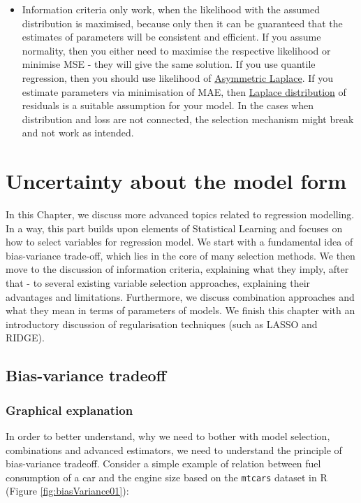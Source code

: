 \documentclass[
]{book}
\providecommand{\tightlist}{%
  \setlength{\itemsep}{0pt}\setlength{\parskip}{0pt}}
\theoremstyle{definition}
\theoremstyle{definition}
\theoremstyle{definition}
\theoremstyle{definition}
\theoremstyle{remark}
\begin{document}
\begin{itemize}
\tightlist
\item
  Information criteria only work, when the likelihood with the assumed distribution is maximised, because only then it can be guaranteed that the estimates of parameters will be consistent and efficient. If you assume normality, then you either need to maximise the respective likelihood or minimise MSE - they will give the same solution. If you use quantile regression, then you should use likelihood of \hyperref[distributionsALaplace]{Asymmetric Laplace}. If you estimate parameters via minimisation of MAE, then \hyperref[distributionsLaplace]{Laplace distribution} of residuals is a suitable assumption for your model. In the cases when distribution and loss are not connected, the selection mechanism might break and not work as intended.
\end{itemize}

\chapter{Uncertainty about the model form}\label{uncertaintyModel}

In this Chapter, we discuss more advanced topics related to regression modelling. In a way, this part builds upon elements of Statistical Learning \citep[see, for example, the textbook of][]{Hastie2009} and focuses on how to select variables for regression model. We start with a fundamental idea of bias-variance trade-off, which lies in the core of many selection methods. We then move to the discussion of information criteria, explaining what they imply, after that - to several existing variable selection approaches, explaining their advantages and limitations. Furthermore, we discuss combination approaches and what they mean in terms of parameters of models. We finish this chapter with an introductory discussion of regularisation techniques (such as LASSO and RIDGE).

\section{Bias-variance tradeoff}\label{bias-variance-tradeoff}

\subsection{Graphical explanation}\label{graphical-explanation}

In order to better understand, why we need to bother with model selection, combinations and advanced estimators, we need to understand the principle of bias-variance tradeoff. Consider a simple example of relation between fuel consumption of a car and the engine size based on the \texttt{mtcars} dataset in R (Figure \ref{fig:biasVariance01}):
\end{document}
